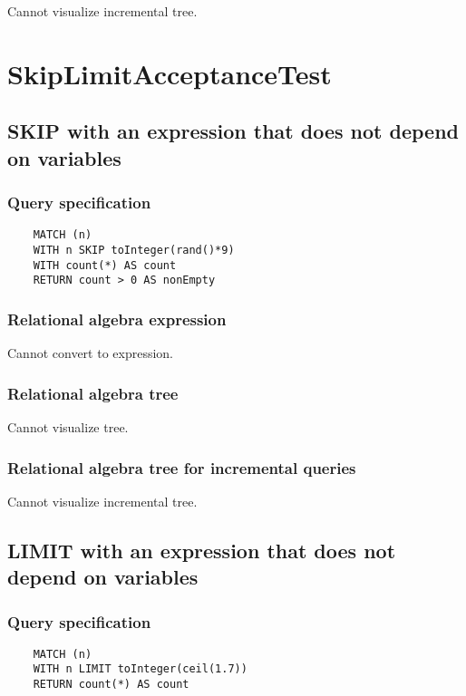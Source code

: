 	Cannot visualize incremental tree.

	\section{SkipLimitAcceptanceTest}

	\subsection{SKIP with an expression that does not depend on variables}

	\subsubsection*{Query specification}

	\begin{lstlisting}
	MATCH (n)
	WITH n SKIP toInteger(rand()*9)
	WITH count(*) AS count
	RETURN count > 0 AS nonEmpty
	\end{lstlisting}


	\subsubsection*{Relational algebra expression}

	Cannot convert to expression.

	\subsubsection*{Relational algebra tree}

	Cannot visualize tree.

	\subsubsection*{Relational algebra tree for incremental queries}

	Cannot visualize incremental tree.
	\subsection{LIMIT with an expression that does not depend on variables}

	\subsubsection*{Query specification}

	\begin{lstlisting}
	MATCH (n)
	WITH n LIMIT toInteger(ceil(1.7))
	RETURN count(*) AS count
	\end{lstlisting}


